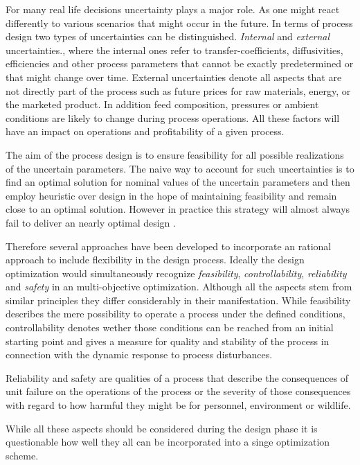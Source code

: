For many real life decisions uncertainty plays a major role. As one might react differently to various 
scenarios that might occur in the future. In terms of process design two types of uncertainties can be 
distinguished. \emph{Internal} and \emph{external} uncertainties., where the internal ones refer to 
transfer-coefficients, diffusivities, efficiencies and other process parameters that cannot be exactly 
predetermined or that might change over time. External uncertainties denote all aspects that are not directly 
part of the process such as future prices for raw materials, energy, or the marketed product. In addition 
feed composition, pressures or ambient conditions are likely to change during process operations. 
All these factors will have an impact on operations and profitability of a given process. 

The aim of the process design is to ensure feasibility for all possible realizations of the uncertain 
parameters. The naive way to account for such uncertainties is to find an optimal solution for nominal 
values of the uncertain parameters and then employ heuristic over design in the hope of maintaining 
feasibility and remain close to an optimal solution. However in practice this strategy will almost always 
fail to deliver an nearly optimal design \cite{Halemane.1983}. 

Therefore several approaches have been developed to incorporate an rational approach to include
flexibility in the design process. Ideally the design optimization would simultaneously recognize 
\emph{feasibility}, \emph{controllability}, \emph{reliability} and \emph{safety} in an multi-objective
optimization. Although all the aspects stem from similar principles they differ considerably in their 
manifestation. While feasibility describes the mere possibility to operate a process under the defined
conditions, controllability denotes wether those conditions can be reached from an initial starting point 
and gives a measure for quality and stability of the process in connection with the dynamic response to 
process disturbances. 

Reliability and safety are qualities of a process that describe the consequences of unit failure on 
the operations of the process or the severity of those consequences with regard to how harmful they 
might be for personnel, environment or wildlife. 

While all these aspects should be considered during the design phase it is questionable how well
they all can be incorporated into a singe optimization scheme. 

